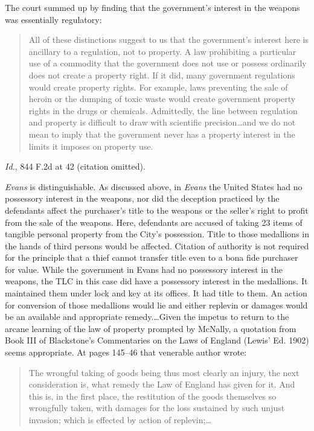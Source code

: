 The court summed up by finding that the government's interest in the weapons was
essentially regulatory:
\begin{quote}
All of these distinctions suggest to us that the government's interest here is
ancillary to a regulation, not to property. A law prohibiting a particular use
of a commodity that the government does not use or possess ordinarily does not
create a property right. If it did, many government regulations would create
property rights. For example, laws preventing the sale of heroin or the dumping
of toxic waste would create government property rights in the drugs or
chemicals. Admittedly, the line between regulation and property is difficult to
draw with scientific precision\ldots and we do not mean to imply that the
government never has a property interest in the limits it imposes on property
use.
\end{quote}
\textit{Id.}, 844 F.2d at 42 (citation omitted).

\textit{Evans} is distinguishable. As discussed above, in \textit{Evans} the
United States had no possessory interest in the weapons, nor did the deception
practiced by the defendants affect the purchaser's title to the weapons or the
seller's right to profit from the sale of the weapons. Here, defendants are
accused of taking 23 items of tangible personal property from the City's
possession. Title to those medallions in the hands of third persons would be
affected. Citation of authority is not required for the principle that a thief
cannot transfer title even to a bona fide purchaser for value. While the
government in Evans had no possessory interest in the weapons, the TLC in this
case did have a possessory interest in the medallions. It maintained them under
lock and key at its offices. It had title to them. An action for conversion of
those medallions would lie and either replevin or damages would be an available
and appropriate remedy.\ldots Given the impetus to return to the arcane
learning of the law of property prompted by McNally, a quotation from Book III
of Blackstone's Commentaries on the Laws of England (Lewis' Ed. 1902) seems
appropriate. At pages 145--46 that venerable author wrote:
\begin{quote}
The wrongful taking of goods being thus most clearly an injury, the next
consideration is, what remedy the Law of England has given for it. And this is,
in the first place, the restitution of the goods themselves so wrongfully
taken, with damages for the loss sustained by such unjust invasion; which is
effected by action of replevin;\ldots
\end{quote}

